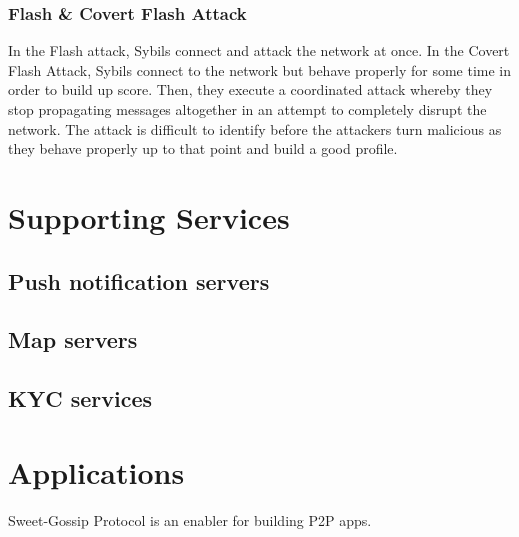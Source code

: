 \documentclass{article}
\begin{document}
\subsubsection{Flash \& Covert Flash Attack}

In the Flash attack, Sybils
connect and attack the network at once. In the Covert Flash
Attack, Sybils connect to the network but behave properly
for some time in order to build up score. Then, they execute a
coordinated attack whereby they stop propagating messages
altogether in an attempt to completely disrupt the network.
The attack is difficult to identify before the attackers turn
malicious as they behave properly up to that point and build
a good profile.


\section{Supporting Services}

\subsection{Push notification servers}

\subsection{Map servers}
\subsection{KYC services}

\section{Applications}

Sweet-Gossip Protocol is an enabler for building P2P apps.



  
\end{document}
